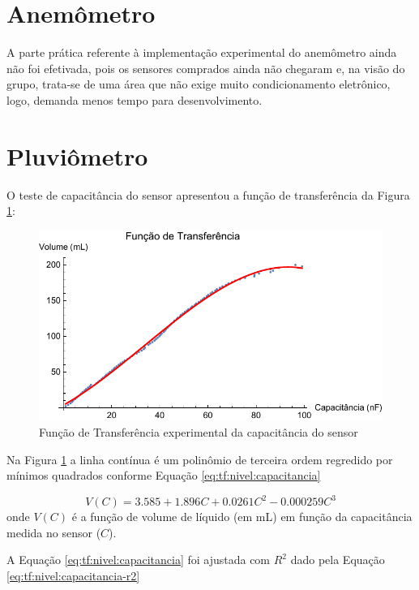 \documentclass[a4paper]{instrumentacao}
\begin{document}
\section{Anemômetro}

A parte prática referente à implementação experimental do anemômetro ainda não foi efetivada, pois os sensores comprados ainda não chegaram e, na visão do grupo, trata-se de uma área que não exige muito condicionamento eletrônico, logo, demanda menos tempo para desenvolvimento.

\section{Pluviômetro}

O teste de capacitância do sensor apresentou a função de transferência da Figura \ref{fig:tf:nivel:capacitancia}:

\begin{figure}[H]
	\centering \includegraphics[width=\textwidth]{Nivel/TransferFunctionPlot.pdf}
	\caption{Função de Transferência experimental da capacitância do sensor}
	\label{fig:tf:nivel:capacitancia}
\end{figure}

Na Figura \ref{fig:tf:nivel:capacitancia} a linha contínua é um polinômio de terceira ordem regredido por mínimos quadrados conforme Equação \ref{eq:tf:nivel:capacitancia}

\begin{equation}
	V(C) = 3.585 + 1.896 C + 0.0261 C^2 - 0.000259 C^3
	\label{eq:tf:nivel:capacitancia}
\end{equation}
\noindent onde $V(C)$ é a função de volume de líquido (em mL) em função da capacitância medida no sensor ($C$).

A Equação \ref{eq:tf:nivel:capacitancia} foi ajustada com $R^2$ dado pela Equação \ref{eq:tf:nivel:capacitancia-r2} 
\end{document}
